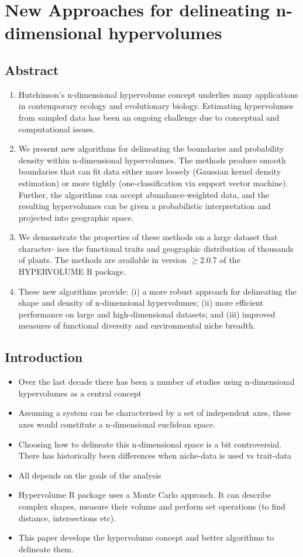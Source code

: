 \section*{New Approaches for delineating n-dimensional hypervolumes \citep{Blonder2018}}

\subsection*{Abstract}
\begin{enumerate}
	\item Hutchinson's n-dimensional hypervolume concept underlies many applications in contemporary ecology and evolutionary biology. Estimating hypervolumes from sampled data has been an ongoing challenge due to conceptual and computational issues.
	\item We present new algorithms for delineating the boundaries and probability density within n-dimensional hypervolumes. The methods produce smooth boundaries that can fit data either more loosely (Gaussian kernel density estimation) or more tightly (one-classification via support vector machine). Further, the algorithms can accept abundance-weighted data, and the resulting hypervolumes can be given a probabilistic interpretation and projected into geographic space.
	\item We demonstrate the properties of these methods on a large dataset that character- ises the functional traits and geographic distribution of thousands of plants. The methods are available in version $\geq$2.0.7 of the HYPERVOLUME R package.
	\item These new algorithms provide: (i) a more robust approach for delineating the shape and density of n-dimensional hypervolumes; (ii) more efficient performance on large and high-dimensional datasets; and (iii) improved measures of functional diversity and environmental niche breadth.
\end{enumerate}

\subsection*{Introduction}
\begin{itemize}
	\item Over the last decade there has been a number of studies using n-dimensional hypervolumes as a central concept
	\item Assuming a system can be characterised by a set of independent axes, these axes would constitute a n-dimensional euclidean space.
	\item Choosing how to delineate this n-dimensional space is a bit controversial. There has historically been differences when niche-data is used vs trait-data
	\item All depends on the  goals of the analysis
	\item Hypervolume R package uses a Monte Carlo approach. It can describe complex shapes, measure their volume and perform set operations	(to find distance, intersections etc).
	\item This paper develops the hypervolume concept and better algorithms to delineate them.		
\end{itemize}

